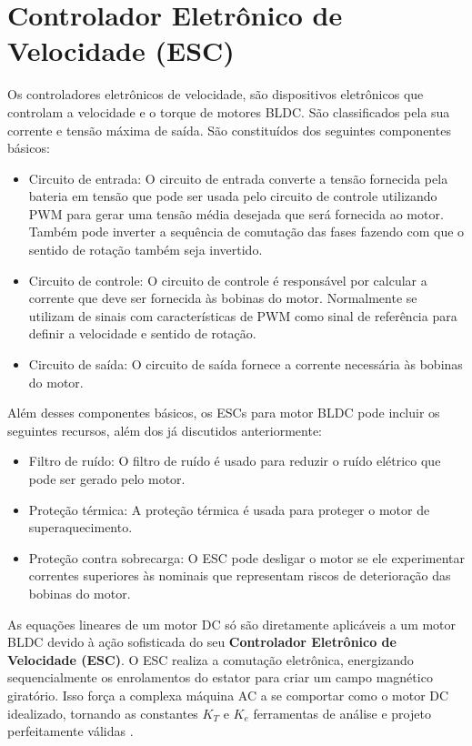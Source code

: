 \documentclass[12pt, a4paper, openright, oneside, brazilian]{abntex2}
\begin{document}
\section{Controlador Eletrônico de Velocidade (ESC)} 
 Os controladores eletrônicos de velocidade, são dispositivos eletrônicos que controlam a velocidade e o torque de motores BLDC. São classificados pela sua corrente e tensão máxima de saída. São constituídos dos seguintes componentes básicos: 

 \begin{itemize} 
 \item Circuito de entrada: O circuito de entrada converte a tensão fornecida pela bateria em tensão que pode ser usada pelo circuito de controle utilizando PWM para gerar uma tensão média desejada que será fornecida ao motor. Também pode inverter a sequência de comutação das fases fazendo com que o sentido de rotação também seja invertido. 
 \item Circuito de controle: O circuito de controle é responsável por calcular a corrente que deve ser fornecida às bobinas do motor. Normalmente se utilizam de sinais com características de PWM como sinal de referência para definir a velocidade e sentido de rotação. 
 \item Circuito de saída: O circuito de saída fornece a corrente necessária às bobinas do motor. 
 \end{itemize} 

 Além desses componentes básicos, os ESCs para motor BLDC pode incluir os seguintes recursos, além dos já discutidos anteriormente: 

 \begin{itemize} 
 \item Filtro de ruído: O filtro de ruído é usado para reduzir o ruído elétrico que pode ser gerado pelo motor. 
 \item Proteção térmica: A proteção térmica é usada para proteger o motor de superaquecimento. 
 \item Proteção contra sobrecarga: O ESC pode desligar o motor se ele experimentar correntes superiores às nominais que representam riscos de deterioração das bobinas do motor. 
 \end{itemize} 

  As equações lineares de um motor DC só são diretamente aplicáveis a um motor BLDC devido à ação sofisticada do seu \textbf{Controlador Eletrônico de Velocidade (ESC)}. O ESC realiza a comutação eletrônica, energizando sequencialmente os enrolamentos do estator para criar um campo magnético giratório. Isso força a complexa máquina AC a se comportar como o motor DC idealizado, tornando as constantes $K_T$ e $K_e$ ferramentas de análise e projeto perfeitamente válidas \parencite{hendershot1994design}.
\end{document}
